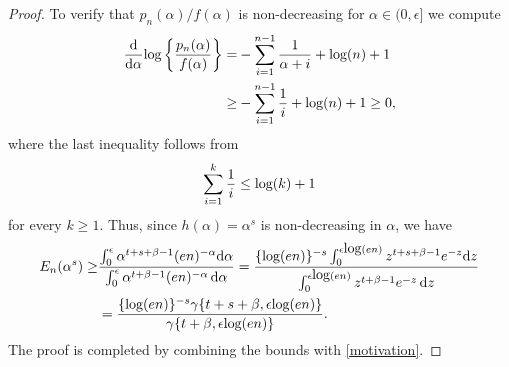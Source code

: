 \documentclass[12pt]{article}
\def\log{\hbox{log}}
\begin{document}
\begin{proof}
To verify that $p_n(\alpha)/f(\alpha)$ is non-decreasing for $\alpha\in(0,\epsilon]$ we compute
\begin{align*}
\frac{\mathrm{d}}{\mathrm{d}\alpha}\log\left\{\frac{p_n(\alpha)}{f(\alpha)}\right\}=&
-\sum_{i=1}^{n-1}\frac{1}{\alpha+i}+\log (n)+1\\
\geq&
-\sum_{i=1}^{n-1}\frac{1}{i}+\log (n)+1
\geq 0,
\end{align*}
where the last inequality follows from
\[
\sum_{i = 1}^{k}\frac{1}{i} \leq \log(k)+1
\]
for every $k \geq 1$. Thus, since $h(\alpha)=\alpha^s$ is non-decreasing in $\alpha$, we have 
$$
\begin{aligned}
E_n(\alpha^{s})
\geq&
\frac{\int_0^\epsilon \alpha^{t+s+\beta-1}(e n)^{-\alpha} \mathrm{d}\alpha}{\int_0^\epsilon \alpha^{t+\beta-1}(e n)^{-\alpha}\, \mathrm{d}\alpha} 
=
\frac{\{\log(en)\}^{-s}\int_0^{\epsilon\log(en)} z^{t+s+\beta-1}e^{-z} \mathrm{d}z}{\int_0^{\epsilon\log(en)} z^{t+\beta-1}e^{-z}\, \mathrm{d}z} \\
&=
\frac{\{\log(en)\}^{-s}\gamma\{t+s+\beta,\epsilon\log(en)\}}{\gamma\{t+\beta,\epsilon\log(en)\}}.
\end{aligned}
$$
The proof is completed by combining the bounds with \eqref{motivation}.
\end{proof}
\end{document}

